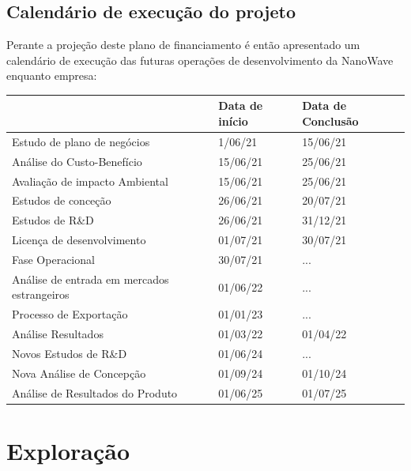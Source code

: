 \documentclass[a4paper]{article}
\begin{document}
\subsection{Calendário de execução do projeto}
Perante a projeção deste plano de financiamento é então apresentado um calendário de execução das futuras operações de desenvolvimento da NanoWave enquanto empresa:
\begin{table}[h]
\begin{tabular}{|l|l|l|}
\hline
                               & Data de início & Data de Conclusão \\ \hline
Estudo de plano de negócios    & 1/06/21          & 15/06/21             \\ \hline
Análise do Custo-Benefício     & 15/06/21          & 25/06/21             \\ \hline
Avaliação de impacto Ambiental & 15/06/21          & 25/06/21             \\ \hline
Estudos de conceção            & 26/06/21          & 20/07/21             \\ \hline
Estudos de R\&D                & 26/06/21          & 31/12/21             \\ \hline
Licença de desenvolvimento     & 01/07/21          & 30/07/21             \\ \hline
Fase Operacional               & 30/07/21          & ...            \\ \hline
Análise de entrada em mercados estrangeiros  & 01/06/22 & ... \\ \hline
Processo de Exportação & 01/01/23 & ... \\ \hline
Análise Resultados               & 01/03/22          & 01/04/22            \\ \hline
Novos Estudos de R\&D & 01/06/24 & ... \\ \hline
Nova Análise de Concepção  & 01/09/24 & 01/10/24 \\ \hline
Análise de Resultados do Produto & 01/06/25 & 01/07/25 \\ \hline

\end{tabular}
\end{table}
\section{Exploração}
\end{document}
